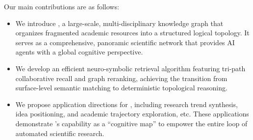 Our main contributions are as follows:
\begin{itemize}[itemsep=1.5ex]
    \item We introduce {\ours}, a large-scale, multi-disciplinary knowledge graph that organizes fragmented academic resources into a structured logical topology. It serves as a comprehensive, panoramic scientific network that provides AI agents with a global cognitive perspective.
    \item We develop an efficient neuro-symbolic retrieval algorithm featuring tri-path collaborative recall and graph reranking, achieving the transition from surface-level semantic matching to deterministic topological reasoning.
    \item We propose application directions for {\ours}, including research trend synthesis, idea positioning, and academic trajectory exploration, etc. These applications demonstrate {\ours}'s capability as a ``cognitive map'' to empower the entire loop of automated scientific research.
\end{itemize}